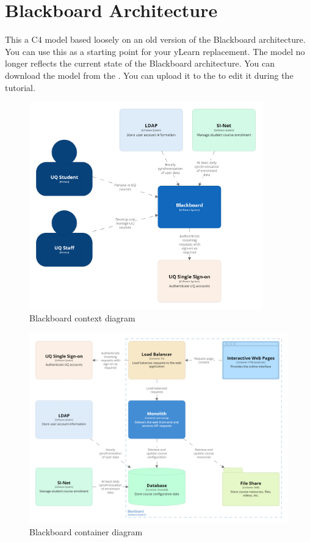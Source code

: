 \documentclass{csse4400}
\begin{document}
\appendix

\section{Blackboard Architecture}
This a C4 model based loosely on an old version of the Blackboard architecture.
You can use this as a starting point for your yLearn replacement.
The model no longer reflects the current state of the Blackboard architecture.
You can download the model from the .
You can upload it to the  to edit it during the tutorial.

\begin{figure}[h!]
\centering
\includegraphics[width=0.9\textwidth]{images/context}
\caption{Blackboard context diagram}
\end{figure}
\vspace{2em}

\begin{figure}
\centering
\includegraphics[width=\textwidth]{images/container}
\caption{Blackboard container diagram}
\end{figure}
\end{document}
